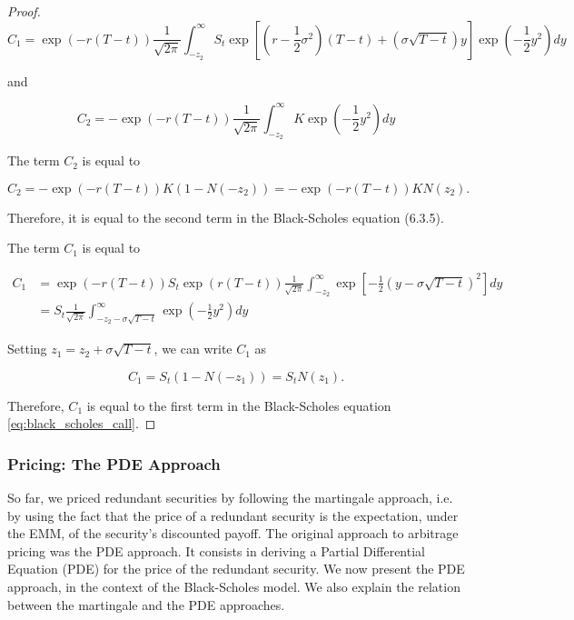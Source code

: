 \documentclass[\topdir/lecture\_notes.tex]{subfiles}
\begin{document}
\begin{proof}
\begin{equation}
C_{1}=\exp (-r(T-t)) \frac{1}{\sqrt{2 \pi}} \int_{-z_{2}}^{\infty} S_{t} \exp \left[\left(r-\frac{1}{2} \sigma^{2}\right)(T-t)+(\sigma \sqrt{T-t}) y\right] \exp \left(-\frac{1}{2} y^{2}\right) d y
\end{equation}

and

\begin{equation}
C_{2}=-\exp (-r(T-t)) \frac{1}{\sqrt{2 \pi}} \int_{-z_{2}}^{\infty} K \exp \left(-\frac{1}{2} y^{2}\right) d y
\end{equation}

The term $C_{2}$ is equal to

\begin{equation}
C_{2}=-\exp (-r(T-t)) K\left(1-N\left(-z_{2}\right)\right)=-\exp (-r(T-t)) K N\left(z_{2}\right) .
\end{equation}

Therefore, it is equal to the second term in the Black-Scholes equation (6.3.5).

The term $C_{1}$ is equal to

\begin{equation}
\begin{aligned}
C_{1} & =\exp (-r(T-t)) S_{t} \exp (r(T-t)) \frac{1}{\sqrt{2 \pi}} \int_{-z_{2}}^{\infty} \exp \left[-\frac{1}{2}(y-\sigma \sqrt{T-t})^{2}\right] d y \\
& =S_{t} \frac{1}{\sqrt{2 \pi}} \int_{-z_{2}-\sigma \sqrt{T-t}}^{\infty} \exp \left(-\frac{1}{2} y^{2}\right) d y
\end{aligned}
\end{equation}

Setting $z_{1}=z_{2}+\sigma \sqrt{T-t}$, we can write $C_{1}$ as

\begin{equation}
C_{1}=S_{t}\left(1-N\left(-z_{1}\right)\right)=S_{t} N\left(z_{1}\right) .
\end{equation}

Therefore, $C_{1}$ is equal to the first term in the Black-Scholes equation \eqref{eq:black_scholes_call}.
\end{proof}

\subsubsection{Pricing: The PDE Approach}
So far, we priced redundant securities by following the martingale approach, i.e. by using the fact that the price of a redundant security is the expectation, under the EMM, of the security's discounted payoff. The original approach to arbitrage pricing was the PDE approach. It consists in deriving a Partial Differential Equation (PDE) for the price of the redundant security. We now present the PDE approach, in the context of the Black-Scholes model. We also explain the relation between the martingale and the PDE approaches.
\end{document}
